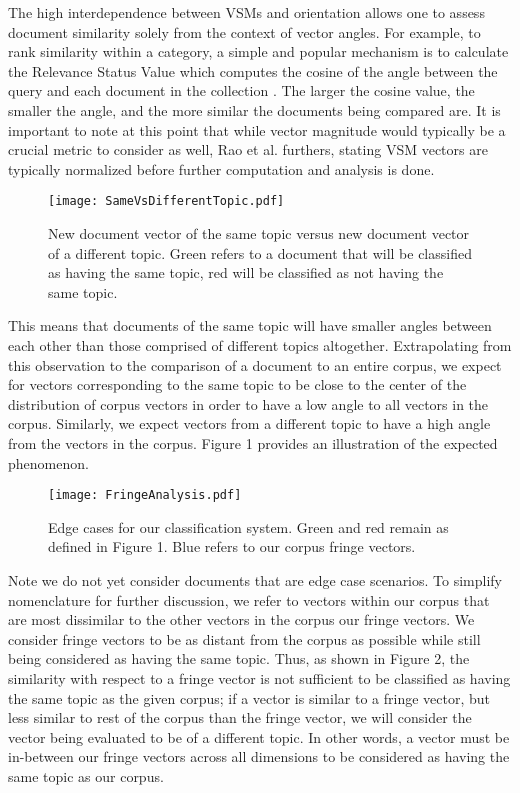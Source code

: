 \documentclass[11pt]{article}
\begin{document}
The high interdependence between VSMs and orientation allows one to assess document similarity solely from the context of vector angles. For example, to rank similarity within a category, a simple and popular mechanism is to calculate the Relevance Status Value which computes the cosine of the angle between the query and each document in the collection \cite{rao2018computational}. The larger the cosine value, the smaller the angle, and the more similar the documents being compared are. It is important to note at this point that while vector magnitude would typically be a crucial metric to consider as well, Rao et al. furthers, stating VSM vectors are typically normalized before further computation and analysis is done.

\begin{figure}[h]
\centerline{\texttt{[image: SameVsDifferentTopic.pdf]}}
\caption{New document vector of the same topic versus new document vector of a different topic. Green refers to a document that will be classified as having the same topic, red will be classified as not having the same topic.}
\label{fig}
\end{figure}

This means that documents of the same topic will have smaller angles between each other than those comprised of different topics altogether. Extrapolating from this observation to the comparison of a document to an entire corpus, we expect for vectors corresponding to the same topic to be close to the center of the distribution of corpus vectors in order to have a low angle to all vectors in the corpus. Similarly, we expect vectors from a different topic to have a high angle from the vectors in the corpus. Figure 1 provides an illustration of the expected phenomenon.

\begin{figure}[h]
\centerline{\texttt{[image: FringeAnalysis.pdf]}}
\caption{Edge cases for our classification system. Green and red remain as defined in Figure 1. Blue refers to our corpus fringe vectors.}
\label{fig}
\end{figure}

Note we do not yet consider documents that are edge case scenarios. To simplify nomenclature for further discussion, we refer to vectors within our corpus that are most dissimilar to the other vectors in the corpus our fringe vectors. We consider fringe vectors to be as distant from the corpus as possible while still being considered as having the same topic. Thus, as shown in Figure 2, the similarity with respect to a fringe vector is not sufficient to be classified as having the same topic as the given corpus; if a vector is similar to a fringe vector, but less similar to rest of the corpus than the fringe vector, we will consider the vector being evaluated to be of a different topic. In other words, a vector must be in-between our fringe vectors across all dimensions to be considered as having the same topic as our corpus. 
\end{document}

